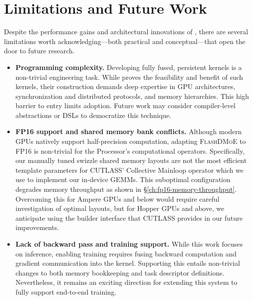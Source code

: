 \chapter{Limitations and Future Work}\label{ch:limitations-and-future-work}
Despite the performance gains and architectural innovations of \sysname, there are several limitations
worth acknowledging---both practical and conceptual---that open the door to future research.
\begin{itemize}
    \item \textbf{Programming complexity.} Developing fully fused, persistent kernels is a non-trivial engineering task.
    While \sysname proves the feasibility and benefit of such kernels,
    their construction demands deep expertise in GPU architectures,
    synchronization and distributed protocols, and memory hierarchies.
    This high barrier to entry limits adoption.
    Future work may consider compiler-level abstractions or DSLs to democratize this technique.

    \item \textbf{FP16 support and shared memory bank conflicts.}
    Although modern GPUs natively support half-precision computation,
    adapting \textsc{FlashDMoE} to FP16 is non-trivial for the Processor's computational operators.
    Specifically, our manually tuned swizzle shared memory layouts are not the most efficient
    template parameters for CUTLASS' Collective Mainloop operator which we use to implement our in-device GEMMs.
    This suboptimal configuration degrades memory throughput as shown in \S\ref{ch:fp16-memory-throughput}.
    Overcoming this for Ampere GPUs and below would require careful investigation of optimal layouts, but
    for Hopper GPUs and above, we anticipate using the builder interface that CUTLASS provides in our future improvements.

    \item \textbf{Lack of backward pass and training support.} While this work focuses on inference,
    enabling training requires fusing backward computation and gradient communication into the kernel.
    Supporting this entails non-trivial changes to both memory bookkeeping and task descriptor definitions.
    Nevertheless, it remains an exciting direction for extending this system to
    fully support end-to-end training.
\end{itemize}


